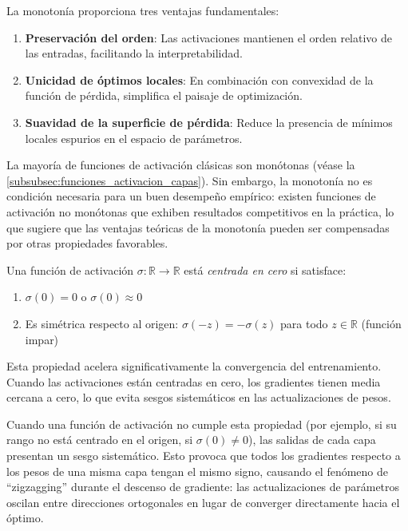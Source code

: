 La monotonía proporciona tres ventajas fundamentales:
\begin{enumerate}
	\item \textbf{Preservación del orden}: Las activaciones mantienen el orden relativo de las entradas, facilitando la interpretabilidad.
	\item \textbf{Unicidad de óptimos locales}: En combinación con convexidad de la función de pérdida, simplifica el paisaje de optimización.
	\item \textbf{Suavidad de la superficie de pérdida}: Reduce la presencia de mínimos locales espurios en el espacio de parámetros.
\end{enumerate}

La mayoría de funciones de activación clásicas son monótonas (véase la \autoref{subsubsec:funciones_activacion_capas}). Sin embargo, la monotonía no es condición necesaria para un buen desempeño empírico: existen funciones de activación no monótonas que exhiben resultados competitivos en la práctica, lo que sugiere que las ventajas teóricas de la monotonía pueden ser compensadas por otras propiedades favorables.

\begin{definition}\label{prop:zero_centered}
	Una función de activación $\sigma: \mathbb{R} \to \mathbb{R}$ está \textit{centrada en cero} si satisface:
	\begin{enumerate}
		\item $\sigma(0) = 0$ o $\sigma(0) \approx 0$
		\item Es simétrica respecto al origen: $\sigma(-z) = -\sigma(z)$ para todo $z \in \mathbb{R}$ (función impar)
	\end{enumerate}
\end{definition}

Esta propiedad acelera significativamente la convergencia del entrenamiento. Cuando las activaciones están centradas en cero, los gradientes tienen media cercana a cero, lo que evita sesgos sistemáticos en las actualizaciones de pesos.

Cuando una función de activación no cumple esta propiedad (por ejemplo, si su rango no está centrado en el origen, si $\sigma(0) \neq 0$), las salidas de cada capa presentan un sesgo sistemático. Esto provoca que todos los gradientes respecto a los pesos de una misma capa tengan el mismo signo, causando el fenómeno de ``zigzagging'' durante el descenso de gradiente: las actualizaciones de parámetros oscilan entre direcciones ortogonales en lugar de converger directamente hacia el óptimo.

